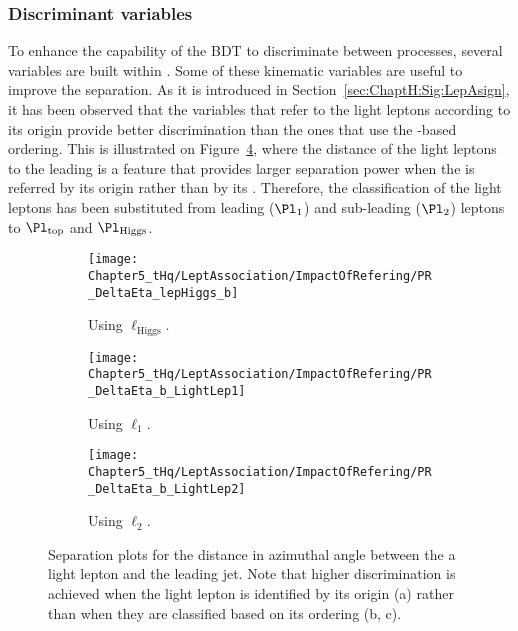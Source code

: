 \subsubsection{Discriminant variables}
\label{sec:ChaptH:EventSelection:BDT:Variables}

To enhance the capability of the BDT to discriminate between processes, several variables are built within \thqloop.
Some of these kinematic variables are useful to improve the separation. 
As it is introduced in Section~\ref{sec:ChaptH:Sig:LepAsign}, it has been observed that the variables that refer to the light leptons according
to its origin provide better discrimination than the ones that use the \pT-based ordering.
This is illustrated on Figure~\ref{fig:ChaptH:EventSelection:BDT:Variables:LeptonNaming}, where
the distance of the light leptons to the leading \bjet is a feature that provides larger separation power when the \emu is referred 
by its origin rather than by its \pT.
Therefore, the classification of the light leptons has been substituted from leading 
($\Pl_{\text{1}}$) and sub-leading ($\Pl_{\text{2}}$) leptons to $\Pl_{\text{top}}$ and $\Pl_{\text{Higgs}}$. 

\begin{figure}[h]
  \centering  
  \begin{subfigure}[b]{0.31\textwidth}
    \centering
    \texttt{[image: Chapter5\_tHq/LeptAssociation/ImpactOfRefering/PR\_DeltaEta\_lepHiggs\_b]}
    \caption{Using $\ell_{\text{Higgs}}$.} %
     \label{fig:ChaptH:EventSelection:BDT:Variables:LeptonNaming:Hggs}
  \end{subfigure}
  \hfill
  \begin{subfigure}[b]{0.31\textwidth}
    \centering
    \texttt{[image: Chapter5\_tHq/LeptAssociation/ImpactOfRefering/PR\_DeltaEta\_b\_LightLep1]}
   \caption{Using $\ell_{1}$.} %
     \label{fig:ChaptH:EventSelection:BDT:Variables:LeptonNaming:L1}
  \end{subfigure}
    \hfill
  \begin{subfigure}[b]{0.31\textwidth}
    \centering
    \texttt{[image: Chapter5\_tHq/LeptAssociation/ImpactOfRefering/PR\_DeltaEta\_b\_LightLep2]}
    \caption{Using $\ell_{2}$.} %
     \label{fig:ChaptH:EventSelection:BDT:Variables:LeptonNaming:L2}
  \end{subfigure}
  \caption{Separation plots for the distance in azimuthal angle between the a light lepton and the leading \btagged jet.
  Note that higher discrimination is achieved when the light lepton is identified by its origin (a) rather than when they
  are classified based on its \pT ordering (b, c).}
  \label{fig:ChaptH:EventSelection:BDT:Variables:LeptonNaming}
\end{figure}


